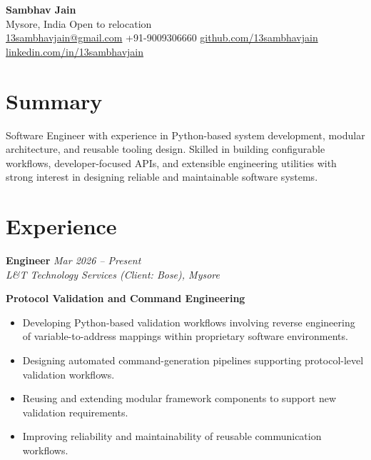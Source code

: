 \documentclass[a4paper,10pt]{article}
\begin{document}

\begin{center}
{\LARGE \textbf{Sambhav Jain}} \\[-2pt]
Mysore, India \textbar{} Open to relocation \\[-2pt]
\href{mailto:13sambhavjain@gmail.com}{13sambhavjain@gmail.com} \quad
+91-9009306660 \quad
\href{https://github.com/13sambhavjain}{github.com/13sambhavjain} \quad
\href{https://linkedin.com/in/13sambhavjain}{linkedin.com/in/13sambhavjain}
\end{center}


\section*{Summary}

Software Engineer with experience in Python-based system development, modular architecture, and reusable tooling design. Skilled in building configurable workflows, developer-focused APIs, and extensible engineering utilities with strong interest in designing reliable and maintainable software systems.


\section*{Experience}

\textbf{Engineer} \hfill \textit{Mar 2026 -- Present} \\
\textit{L\&T Technology Services (Client: Bose), Mysore}

\textbf{Protocol Validation and Command Engineering}

\begin{itemize}

\item Developing Python-based validation workflows involving reverse engineering of variable-to-address mappings within proprietary software environments.

\item Designing automated command-generation pipelines supporting protocol-level validation workflows.

\item Reusing and extending modular framework components to support new validation requirements.

\item Improving reliability and maintainability of reusable communication workflows.

\end{itemize}
\end{document}
